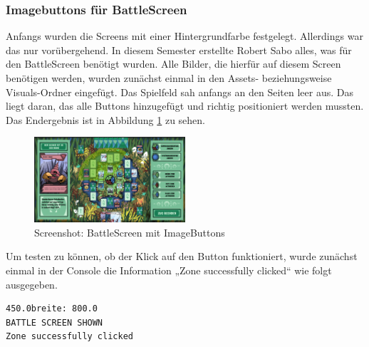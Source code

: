 \subsubsection{Imagebuttons für BattleScreen}
Anfangs wurden die Screens mit einer Hintergrundfarbe festgelegt. 
Allerdings war das nur vorübergehend. In diesem Semester erstellte Robert Sabo alles, was für den BattleScreen benötigt wurden.
Alle Bilder, die hierfür auf diesem Screen benötigen werden, wurden zunächst einmal in den Assets- beziehungsweise Visuals-Ordner eingefügt. Das Spielfeld sah anfangs an den Seiten leer aus. Das liegt daran, das alle Buttons hinzugefügt und richtig positioniert werden mussten. Das Endergebnis ist in Abbildung \ref{fig:Screenshot: BattleScreen mit ImageButtons} zu sehen.
\begin{figure}
\includegraphics[width=0.5\textwidth]{../img/screenshot_battlescreen_buttons.PNG}
\caption{Screenshot: BattleScreen mit ImageButtons}
\label{fig:Screenshot: BattleScreen mit ImageButtons}
\end{figure}
Um testen zu können, ob der Klick auf den Button funktioniert, wurde zunächst einmal in der Console die Information „Zone successfully clicked“ wie folgt ausgegeben. \\
\begin{lstlisting}
450.0breite: 800.0
BATTLE SCREEN SHOWN
Zone successfully clicked
\end{lstlisting}

